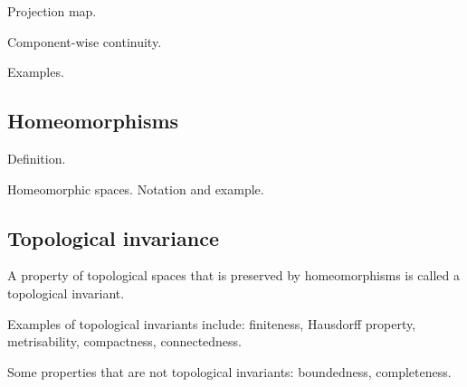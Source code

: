 Projection map.

Component-wise continuity.

Examples.

\subsection{Homeomorphisms}
Definition.

Homeomorphic spaces. Notation and example.



\subsection{Topological invariance}
\begin{ndfn}
  A property of topological spaces that is preserved by homeomorphisms is called a topological invariant.
\end{ndfn}

Examples of topological invariants include: finiteness, Hausdorff property, metrisability, compactness, connectedness.

Some properties that are not topological invariants: boundedness, completeness.
